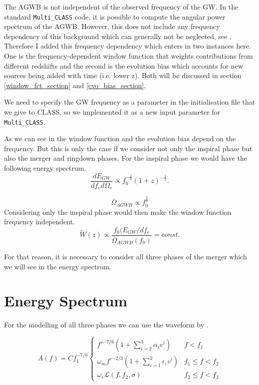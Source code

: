 The AGWB is not independent of the observed frequency of the GW. In the standard 
{\tt Multi\_CLASS} code, it is possible to compute the angular power spectrum of the AGWB. However, this does not include any frequency dependency of this background which can generally not be neglected, see \cite{dallarmi_dipole_2022}. Therefore I added this frequency dependency which enters in two instances here. One is the frequency-dependent window function that weights contributions from different redshifts and the second is the evolution bias which accounts for new sources being added with time (i.e. lower z). Both will be discussed in section \ref{window_fct_section} and \ref{evo_bias_section}.

We need to specify the GW frequency as a parameter in the initialisation file that we give to CLASS, so we implemented it as a new input parameter for {\tt Multi\_CLASS}.

As we can see in \cite{dallarmi_dipole_2022} the window function and the evolution bias 
depend on the frequency. But this is only the case if we consider not only the
inspiral phase but also the merger and ringdown phases. For the inspiral phase we would have the following energy spectrum.
\begin{equation}
    \frac{dE_{GW}}{df_e d\Omega_e} \propto f_0^{-\frac{1}{3}}(1+z)^{-\frac{1}{3}} .
\end{equation}

\begin{equation}
    \bar{\Omega}_{AGWB}\propto f_0^{\frac{2}{3}}
\end{equation}
Considering only the inspiral phase would then make the window function frequency independent.
\begin{equation}
    \tilde{W}(z)\propto \frac{f_0(E_{GW}/df_e}{\bar{\Omega}_{AGWB}(f_0)} = const.
\end{equation}

For that reason, it is necessary to consider all three phases of the merger which we will see in the energy spectrum.


\section{Energy Spectrum}



For the modelling of all three phases we can 
use the waveform by \cite{ajith_inspiral-merger-ringdown_2011}.

\[ A(f) = C f_1^{-7/6} \begin{cases}
        f'^{-7/6}(1+ \sum_{i=2}^3\alpha_i v^i) & f<f_1 \\
        \omega_m f'^{-2/3}(1+ \sum_{i=1}^2 \epsilon_i v^i) & f_1 \leq f < f_2 \\
        \omega_r \mathcal{L}(f, f_2, \sigma) & f_2 \leq f < f_3
\end{cases}
\]

